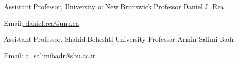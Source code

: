 \begin{cventries}

    \cventry
    {Assistant Professor, University of New Brunswick}
    {Professor Daniel J. Rea}
    {}
    {}
    {
      \begin{cvitems}
	    \item{Email:\href{mailto:daniel.rea@unb.ca}{ daniel.rea{@}unb.ca}}
      \end{cvitems}
    }
    \vspace{0.3 cm}


    \cventry
    {Assistant Professor, Shahid Beheshti University}
    {Professor Armin Salimi-Badr}
    {}
    {}
    {
      \begin{cvitems}
	    \item{Email:\href{mailto:a_salimibadr@sbu.ac.ir}{ a\_salimibadr{@}sbu.ac.ir}}
      \end{cvitems}
    }
    \vspace{0.3 cm}




\end{cventries}
